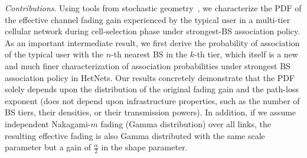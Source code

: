 \documentclass[final]{IEEEtran}
\begin{document}
\textit{Contributions}. Using tools from stochastic geometry~\cite{AndGupJ2016}, we characterize the PDF of the effective channel fading gain experienced by the typical user in a multi-tier cellular network during cell-selection phase under strongest-BS association policy. As an important intermediate result, we first derive the probability of association of the typical user with the $n$-th nearest BS in the $k$-th tier, which itself is a new and much finer characterization of association probabilities under strongest BS association policy in HetNets. Our results concretely demonstrate that the PDF solely depends upon the distribution of the original fading gain and the path-loss exponent (does not depend upon infrastructure properties, such as the number of BS tiers, their  densities, or their transmission powers). In addition, if we assume independent Nakagami-$m$ fading (Gamma distribution) over all links, the resulting effective fading is also Gamma distributed with the same scale parameter but a gain of $\frac{\alpha}{2}$ in the shape parameter.

\vspace{-3mm}
\end{document}
